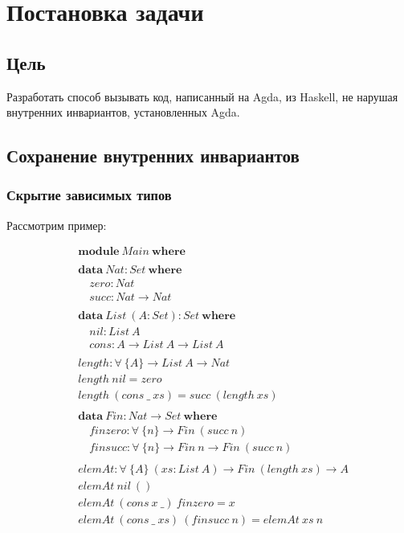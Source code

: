 \section{Постановка задачи}

\subsection{Цель}\label{sec:task-goal}

Разработать способ вызывать код, написанный на Agda, из Haskell, не нарушая
внутренних инвариантов, установленных Agda.

\subsection{Сохранение внутренних инвариантов}

\subsubsection{Скрытие зависимых типов}

Рассмотрим пример:

\begin{align*}
&\mathbf{module}\ Main\ \mathbf{where}\\
\\
&\mathbf{data}\ Nat : Set\ \mathbf{where}\\
&\quad zero : Nat\\
&\quad succ : Nat \rightarrow Nat\\
\\
&\mathbf{data}\ List\ (A : Set) : Set\ \mathbf{where}\\
&\quad nil : List\ A\\
&\quad cons : A \rightarrow List\ A \rightarrow List\ A\\
\\
&length : \forall\ \{A\} \rightarrow List\ A \rightarrow Nat\\
&length\ nil = zero\\
&length\ (cons\ \_\ xs) = succ\ (length\ xs)\\
\\
&\mathbf{data}\ Fin : Nat \rightarrow Set\ \mathbf{where}\\
&\quad finzero : \forall\ \{n\} \rightarrow Fin\ (succ\ n)\\
&\quad finsucc : \forall\ \{n\} \rightarrow Fin\ n \rightarrow Fin\ (succ\ n)\\
\\
&elemAt : \forall\ \{A\}\ (xs : List\ A) \rightarrow Fin\ (length\ xs) \rightarrow A\\
&elemAt\ nil\ ()\\
&elemAt\ (cons\ x\ \_)\ finzero = x\\
&elemAt\ (cons\ \_\ xs)\ (finsucc\ n) = elemAt\ xs\ n
\end{align*}

